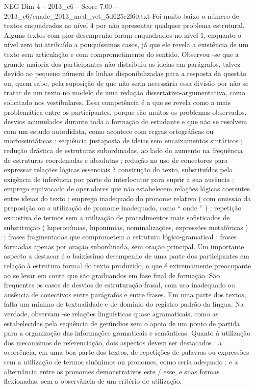 \begin{textsample}{NEG Dim 4 – 2013\_c6 – Score 7.00 – 2013\_c6/enade\_2013\_med\_vet\_5d625e2f60.txt}
Foi muito baixo o número de textos enquadrados no nível 4 por não apresentar qualquer problema estrutural.
Alguns textos com pior desempenho foram enquadrados no nível 1, enquanto o nível zero foi atribuído a pouquíssimos casos, já que ele revela a existência de um texto sem articulação e com comprometimento do sentido.
Observou -se que a grande maioria dos participantes não distribuiu as ideias em parágrafos, talvez devido ao pequeno número de linhas disponibilizadas para a resposta da questão ou, quem sabe, pela suposição de que não seria necessária essa divisão por não se tratar de um texto no modelo de uma redação dissertativo-argumentativa, como solicitado nos vestibulares.
Essa competência é a que se revela como a mais problemática entre os participantes, porque são muitos os problemas observados, desvios acumulados durante toda a formação do estudante e que não se resolvem com um estudo autodidata, como acontece com regras ortográficas ou morfossintáticas : sequência justaposta de ideias sem encaixamentos sintáticos ; redução drástica de estruturas subordinadas, ao lado do aumento na frequência de estruturas coordenadas e absolutas ; redução no uso de conectores para expressar relações lógicas essenciais à construção do texto, substituídas pela exigência de inferência por parte do interlocutor para suprir a sua ausência ; emprego equivocado de operadores que não estabelecem relações lógicas coerentes entre ideias do texto ; emprego inadequado do pronome relativo ( com omissão da preposição ou a utilização de pronome inadequado, como “ onde ” ) ; repetição exaustiva de termos sem a utilização de procedimentos mais sofisticados de substituição ( hiperonímias, hiponímias, nominalizações, expressões metafóricas ) ; frases fragmentadas que comprometem a estrutura lógico-gramatical ; frases formadas apenas por oração subordinada, sem oração principal.
Um importante aspecto a destacar é o baixíssimo desempenho de uma parte dos participantes em relação à estrutura formal do texto produzido, o que é extremamente preocupante ao se levar em conta que são graduandos em fase final de formação.
São frequentes os casos de desvios de estruturação frasal, com uso inadequado ou ausência de conectivos entre parágrafos e entre frases.
Em uma parte dos textos, falta um mínimo de textualidade e de domínio do registro padrão da língua.
Na verdade, observam -se relações linguísticas quase agramaticais, como as estabelecidas pela sequência de gerúndios sem o apoio de um ponto de partida para a organização das informações gramaticais e semânticas.
Quanto à utilização dos mecanismos de referenciação, dois aspectos devem ser destacados : a ocorrência, em uma boa parte dos textos, de repetições de palavras ou expressões sem a utilização de termos sinônimos ou pronomes, como seria adequado ; e a alternância entre os pronomes demonstrativos este / esse, e suas formas flexionadas, sem a observância de um critério de utilização.

\end{textsample}

